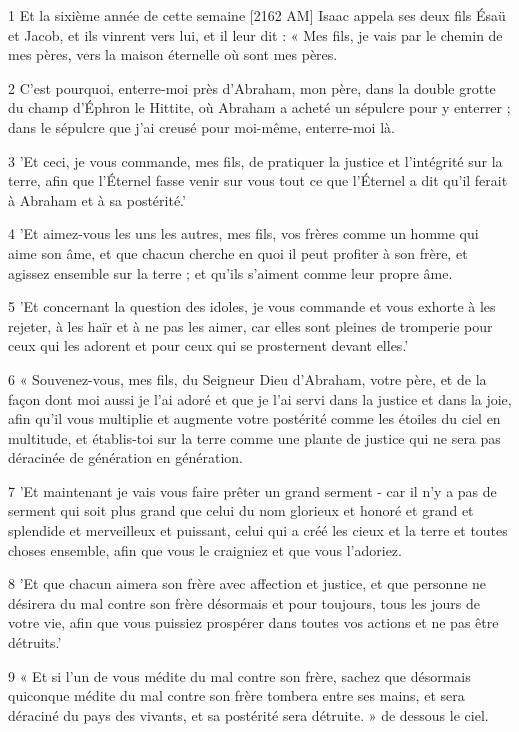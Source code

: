 \par 1 Et la sixième année de cette semaine [2162 AM] Isaac appela ses deux fils Ésaü et Jacob, et ils vinrent vers lui, et il leur dit : « Mes fils, je vais par le chemin de mes pères, vers la maison éternelle où sont mes pères.
\par 2 C'est pourquoi, enterre-moi près d'Abraham, mon père, dans la double grotte du champ d'Éphron le Hittite, où Abraham a acheté un sépulcre pour y enterrer ; dans le sépulcre que j'ai creusé pour moi-même, enterre-moi là.
\par 3 'Et ceci, je vous commande, mes fils, de pratiquer la justice et l'intégrité sur la terre, afin que l'Éternel fasse venir sur vous tout ce que l'Éternel a dit qu'il ferait à Abraham et à sa postérité.'
\par 4 'Et aimez-vous les uns les autres, mes fils, vos frères comme un homme qui aime son âme, et que chacun cherche en quoi il peut profiter à son frère, et agissez ensemble sur la terre ; et qu'ils s'aiment comme leur propre âme.
\par 5 'Et concernant la question des idoles, je vous commande et vous exhorte à les rejeter, à les haïr et à ne pas les aimer, car elles sont pleines de tromperie pour ceux qui les adorent et pour ceux qui se prosternent devant elles.'
\par 6 « Souvenez-vous, mes fils, du Seigneur Dieu d'Abraham, votre père, et de la façon dont moi aussi je l'ai adoré et que je l'ai servi dans la justice et dans la joie, afin qu'il vous multiplie et augmente votre postérité comme les étoiles du ciel en multitude, et établis-toi sur la terre comme une plante de justice qui ne sera pas déracinée de génération en génération.
\par 7 'Et maintenant je vais vous faire prêter un grand serment - car il n'y a pas de serment qui soit plus grand que celui du nom glorieux et honoré et grand et splendide et merveilleux et puissant, celui qui a créé les cieux et la terre et toutes choses ensemble, afin que vous le craigniez et que vous l'adoriez.
\par 8 'Et que chacun aimera son frère avec affection et justice, et que personne ne désirera du mal contre son frère désormais et pour toujours, tous les jours de votre vie, afin que vous puissiez prospérer dans toutes vos actions et ne pas être détruits.'
\par 9 « Et si l'un de vous médite du mal contre son frère, sachez que désormais quiconque médite du mal contre son frère tombera entre ses mains, et sera déraciné du pays des vivants, et sa postérité sera détruite. » de dessous le ciel.

